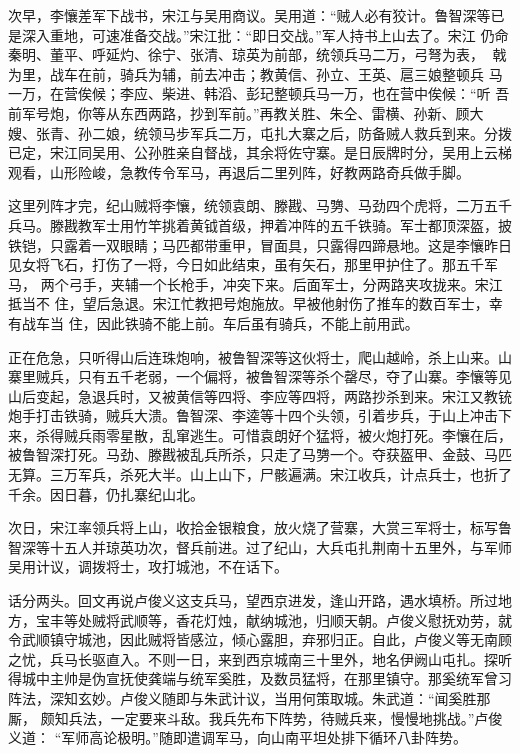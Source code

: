 次早，李懹差军下战书，宋江与吴用商议。吴用道：“贼人必有狡计。鲁智深等已
是深入重地，可速准备交战。”宋江批：“即日交战。”军人持书上山去了。宋江
仍命秦明、董平、呼延灼、徐宁、张清、琼英为前部，统领兵马二万，弓弩为表，
戟为里，战车在前，骑兵为辅，前去冲击；教黄信、孙立、王英、扈三娘整顿兵
马一万，在营俟候；李应、柴进、韩滔、彭玘整顿兵马一万，也在营中俟候：“听
吾前军号炮，你等从东西两路，抄到军前。”再教关胜、朱仝、雷横、孙新、顾大
嫂、张青、孙二娘，统领马步军兵二万，屯扎大寨之后，防备贼人救兵到来。分拨
已定，宋江同吴用、公孙胜亲自督战，其余将佐守寨。是日辰牌时分，吴用上云梯
观看，山形险峻，急教传令军马，再退后二里列阵，好教两路奇兵做手脚。

这里列阵才完，纪山贼将李懹，统领袁朗、滕戡、马勥、马劲四个虎将，二万五千
兵马。滕戡教军士用竹竿挑着黄钺首级，押着冲阵的五千铁骑。军士都顶深盔，披
铁铠，只露着一双眼睛；马匹都带重甲，冒面具，只露得四蹄悬地。这是李懹昨日
见女将飞石，打伤了一将，今日如此结束，虽有矢石，那里甲护住了。那五千军马，
两个弓手，夹辅一个长枪手，冲突下来。后面军士，分两路夹攻拢来。宋江抵当不
住，望后急退。宋江忙教把号炮施放。早被他射伤了推车的数百军士，幸有战车当
住，因此铁骑不能上前。车后虽有骑兵，不能上前用武。

正在危急，只听得山后连珠炮响，被鲁智深等这伙将士，爬山越岭，杀上山来。山
寨里贼兵，只有五千老弱，一个偏将，被鲁智深等杀个罄尽，夺了山寨。李懹等见
山后变起，急退兵时，又被黄信等四将、李应等四将，两路抄杀到来。宋江又教铳
炮手打击铁骑，贼兵大溃。鲁智深、李逵等十四个头领，引着步兵，于山上冲击下
来，杀得贼兵雨零星散，乱窜逃生。可惜袁朗好个猛将，被火炮打死。李懹在后，
被鲁智深打死。马劲、滕戡被乱兵所杀，只走了马勥一个。夺获盔甲、金鼓、马匹
无算。三万军兵，杀死大半。山上山下，尸骸遍满。宋江收兵，计点兵士，也折了
千余。因日暮，仍扎寨纪山北。

次日，宋江率领兵将上山，收拾金银粮食，放火烧了营寨，大赏三军将士，标写鲁
智深等十五人并琼英功次，督兵前进。过了纪山，大兵屯扎荆南十五里外，与军师
吴用计议，调拨将士，攻打城池，不在话下。

话分两头。回文再说卢俊义这支兵马，望西京进发，逢山开路，遇水填桥。所过地
方，宝丰等处贼将武顺等，香花灯烛，献纳城池，归顺天朝。卢俊义慰抚劝劳，就
令武顺镇守城池，因此贼将皆感泣，倾心露胆，弃邪归正。自此，卢俊义等无南顾
之忧，兵马长驱直入。不则一日，来到西京城南三十里外，地名伊阙山屯扎。探听
得城中主帅是伪宣抚使龚端与统军奚胜，及数员猛将，在那里镇守。那奚统军曾习
阵法，深知玄妙。卢俊义随即与朱武计议，当用何策取城。朱武道：“闻奚胜那厮，
颇知兵法，一定要来斗敌。我兵先布下阵势，待贼兵来，慢慢地挑战。”卢俊义道：
“军师高论极明。”随即遣调军马，向山南平坦处排下循环八卦阵势。

